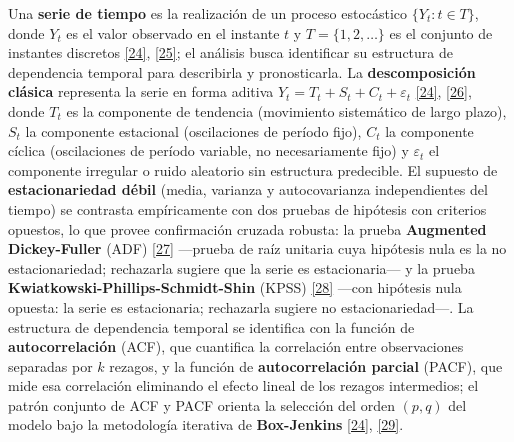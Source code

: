 \documentclass[12pt,letterpaper]{report}
\newcommand{\cita}[1]{\hyperref[bib:#1]{[#1]}}
\begin{document}
Una \textbf{serie de tiempo} es la realización de un proceso estocástico $\{Y_t : t \in T\}$, donde $Y_t$ es el valor observado en el instante $t$ y $T = \{1, 2, \ldots\}$ es el conjunto de instantes discretos \cita{24}, \cita{25}; el análisis busca identificar su estructura de dependencia temporal para describirla y pronosticarla. La \textbf{descomposición clásica} representa la serie en forma aditiva $Y_t = T_t + S_t + C_t + \varepsilon_t$ \cita{24}, \cita{26}, donde $T_t$ es la componente de tendencia (movimiento sistemático de largo plazo), $S_t$ la componente estacional (oscilaciones de período fijo), $C_t$ la componente cíclica (oscilaciones de período variable, no necesariamente fijo) y $\varepsilon_t$ el componente irregular o ruido aleatorio sin estructura predecible. El supuesto de \textbf{estacionariedad débil} (media, varianza y autocovarianza independientes del tiempo) se contrasta empíricamente con dos pruebas de hipótesis con criterios opuestos, lo que provee confirmación cruzada robusta: la prueba \textbf{Augmented Dickey-Fuller} (ADF) \cita{27} ---prueba de raíz unitaria cuya hipótesis nula es la no estacionariedad; rechazarla sugiere que la serie es estacionaria--- y la prueba \textbf{Kwiatkowski-Phillips-Schmidt-Shin} (KPSS) \cita{28} ---con hipótesis nula opuesta: la serie es estacionaria; rechazarla sugiere no estacionariedad---. La estructura de dependencia temporal se identifica con la función de \textbf{autocorrelación} (ACF), que cuantifica la correlación entre observaciones separadas por $k$ rezagos, y la función de \textbf{autocorrelación parcial} (PACF), que mide esa correlación eliminando el efecto lineal de los rezagos intermedios; el patrón conjunto de ACF y PACF orienta la selección del orden $(p, q)$ del modelo bajo la metodología iterativa de \textbf{Box-Jenkins} \cita{24}, \cita{29}.
\end{document}

